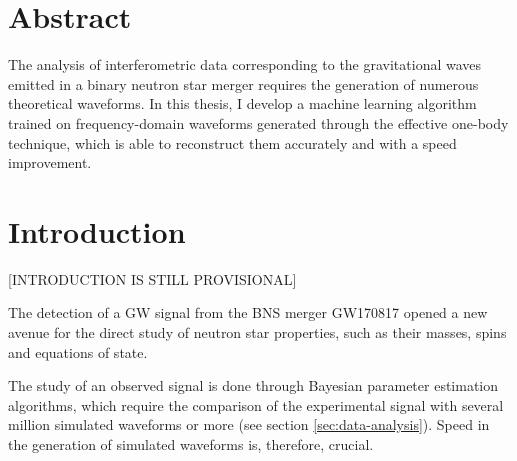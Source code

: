\documentclass[main.tex]{subfiles}
\begin{document}
\vspace*{\fill}
\section*{Abstract}
The analysis of interferometric data corresponding to the gravitational waves emitted in a binary neutron star merger requires the generation of numerous theoretical waveforms.
In this thesis, I develop a machine learning algorithm trained on frequency-domain waveforms generated through the effective one-body technique, which is able to reconstruct them accurately and with a speed improvement.
\vspace*{\fill}


\newpage




\section*{Introduction}

[INTRODUCTION IS STILL PROVISIONAL]

The detection of a \ac{GW} signal from the \ac{BNS} merger GW170817 \cite{abbottGW170817ObservationGravitational2017} opened a new avenue for the direct study of neutron star properties, such as their masses, spins and equations of state.

The study of an observed signal is done through Bayesian parameter estimation algorithms, which require the comparison of the experimental signal with several million \cite{lackeyEffectiveonebodyWaveformsBinary2017} simulated waveforms or more (see section \ref{sec:data-analysis}).
Speed in the generation of simulated waveforms is, therefore, crucial.
\end{document}
